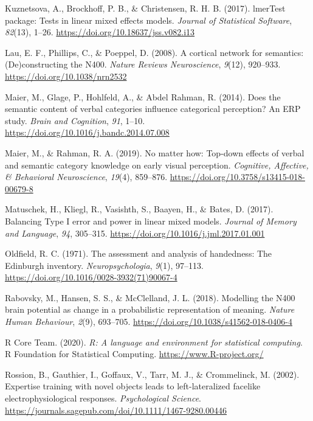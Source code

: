 \documentclass[
  english,
  man,11pt,floatsintext]{apa7}
\newlength{\cslhangindent}
\newenvironment{cslreferences}%
  {\setlength{\parindent}{0pt}%
  \everypar{\setlength{\hangindent}{\cslhangindent}}\ignorespaces}%
  {\par}
\begin{document}
\begin{cslreferences}
\leavevmode\hypertarget{ref-R-lmerTest}{}%
Kuznetsova, A., Brockhoff, P. B., \& Christensen, R. H. B. (2017). lmerTest package: Tests in linear mixed effects models. \emph{Journal of Statistical Software}, \emph{82}(13), 1--26. \url{https://doi.org/10.18637/jss.v082.i13}

\leavevmode\hypertarget{ref-lau2008}{}%
Lau, E. F., Phillips, C., \& Poeppel, D. (2008). A cortical network for semantics: (De)constructing the N400. \emph{Nature Reviews Neuroscience}, \emph{9}(12), 920--933. \url{https://doi.org/10.1038/nrn2532}

\leavevmode\hypertarget{ref-maier2014}{}%
Maier, M., Glage, P., Hohlfeld, A., \& Abdel Rahman, R. (2014). Does the semantic content of verbal categories influence categorical perception? An ERP study. \emph{Brain and Cognition}, \emph{91}, 1--10. \url{https://doi.org/10.1016/j.bandc.2014.07.008}

\leavevmode\hypertarget{ref-maier2019}{}%
Maier, M., \& Rahman, R. A. (2019). No matter how: Top-down effects of verbal and semantic category knowledge on early visual perception. \emph{Cognitive, Affective, \& Behavioral Neuroscience}, \emph{19}(4), 859--876. \url{https://doi.org/10.3758/s13415-018-00679-8}

\leavevmode\hypertarget{ref-matuschek2017}{}%
Matuschek, H., Kliegl, R., Vasishth, S., Baayen, H., \& Bates, D. (2017). Balancing Type I error and power in linear mixed models. \emph{Journal of Memory and Language}, \emph{94}, 305--315. \url{https://doi.org/10.1016/j.jml.2017.01.001}

\leavevmode\hypertarget{ref-oldfield1971}{}%
Oldfield, R. C. (1971). The assessment and analysis of handedness: The Edinburgh inventory. \emph{Neuropsychologia}, \emph{9}(1), 97--113. \url{https://doi.org/10.1016/0028-3932(71)90067-4}

\leavevmode\hypertarget{ref-rabovsky2018}{}%
Rabovsky, M., Hansen, S. S., \& McClelland, J. L. (2018). Modelling the N400 brain potential as change in a probabilistic representation of meaning. \emph{Nature Human Behaviour}, \emph{2}(9), 693--705. \url{https://doi.org/10.1038/s41562-018-0406-4}

\leavevmode\hypertarget{ref-R-base}{}%
R Core Team. (2020). \emph{R: A language and environment for statistical computing}. R Foundation for Statistical Computing. \url{https://www.R-project.org/}

\leavevmode\hypertarget{ref-rossion2002}{}%
Rossion, B., Gauthier, I., Goffaux, V., Tarr, M. J., \& Crommelinck, M. (2002). Expertise training with novel objects leads to left-lateralized facelike electrophysiological responses. \emph{Psychological Science}. \url{https://journals.sagepub.com/doi/10.1111/1467-9280.00446}


\end{cslreferences}
\end{document}
